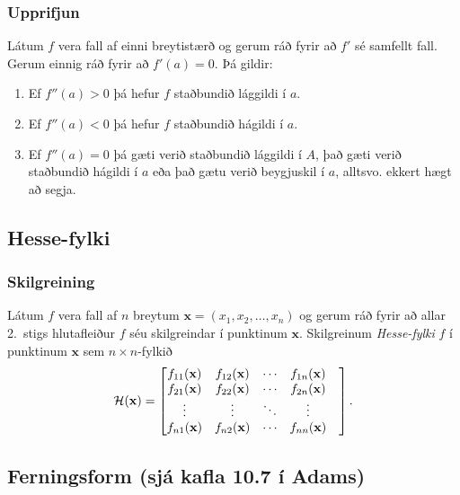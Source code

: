 \subsubsection{Upprifjun  }
 Látum $f$ vera fall af einni breytistærð og
gerum ráð fyrir að $f'$ sé samfellt fall.  Gerum einnig ráð fyrir að
$f'(a)=0$.  Þá gildir: 

\begin {enumerate}
 \item Ef $f''(a)>0$ þá hefur $f$ staðbundið lággildi í $a$.
 \item  Ef $f''(a)<0$ þá hefur $f$ staðbundið hágildi í $a$.
 \item  Ef $f''(a)=0$ þá gæti verið staðbundið lággildi í $A$, það gæti
     verið staðbundið hágildi í $a$ eða það gætu verið beygjuskil í
     $a$, alltsvo. ekkert hægt að segja. 
 \end {enumerate}






\subsection{Hesse-fylki} 

\subsubsection{Skilgreining  }
Látum $f$ vera fall af $n$ breytum $\mathbf{x} = (x_1,x_2,\ldots,x_n)$ og
gerum ráð fyrir að allar 2.~stigs hlutafleiður $f$ séu skilgreindar í
punktinum $\mathbf{x}$.  Skilgreinum  {\em \color{red} Hesse-fylki} $f$ í punktinum
$\mathbf{x}$ sem $n\times n$-fylkið
$${\cal H}(\mathbf{x})=\begin{bmatrix} f_{11}(\mathbf{x})&f_{12}(\mathbf{x}) & \cdots & f_{1n}(\mathbf{x})\\
 f_{21}(\mathbf{x})&f_{22}(\mathbf{x}) & \cdots & f_{2n}(\mathbf{x}) \\
 \vdots & \vdots & \ddots & \vdots & \\
  f_{n1}(\mathbf{x})&f_{n2}(\mathbf{x}) & \cdots & f_{nn}(\mathbf{x})\end{bmatrix}.$$





\subsection{Ferningsform (sjá kafla 10.7 í Adams)} 

